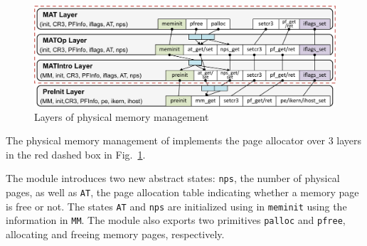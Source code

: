 {
\setlength{\belowcaptionskip}{-10pt}
\begin{figure}
\begin{center}
\includegraphics[scale=0.31]{figs/pmm_layer}	
\caption{Layers of physical memory management}
\label{fig:base:pmm:layers}
\end{center}
\vspace*{-14pt}
\end{figure}
}

The physical memory management of \mCTOSbase{}
implements the page allocator over 3 layers in the red dashed box in
Fig.\ \ref{fig:base:pmm:layers}.
The module introduces two new abstract states: \verb"nps", the number
of physical pages, as well as \verb"AT", the page allocation table
indicating whether a memory page is free or not.  The states \verb"AT"
and \verb"nps" are initialized using in \verb"meminit" using the information
in \verb"MM". The module also exports two primitives
\verb"palloc" and \verb"pfree", allocating and freeing memory pages,
respectively.

